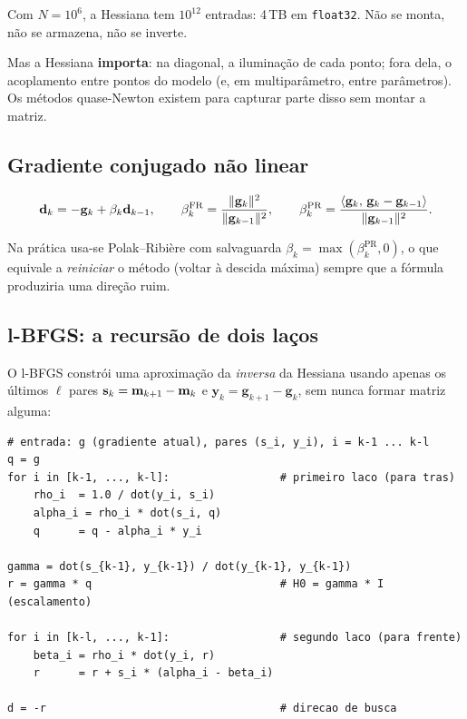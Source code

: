 \documentclass[11pt,a4paper,oneside]{report}
\begin{document}
Com $N = 10^{6}$, a Hessiana tem $10^{12}$ entradas: 4\,TB em
\texttt{float32}. N\~ao se monta, n\~ao se armazena, n\~ao se inverte.

Mas a Hessiana \textbf{importa}: na diagonal, a ilumina\c{c}\~ao de cada
ponto; fora dela, o acoplamento entre pontos do modelo (e, em
multipar\^ametro, entre par\^ametros). Os m\'etodos quase-Newton existem para
capturar parte disso sem montar a matriz.

\subsection*{Gradiente conjugado n\~ao linear}

\begin{equation}
\mathbf{d}_k = -\mathbf{g}_k + \beta_k \mathbf{d}_{k-1},
\qquad
\beta_k^{\text{FR}} = \frac{\lVert \mathbf{g}_k \rVert^{2}}{\lVert \mathbf{g}_{k-1} \rVert^{2}},
\qquad
\beta_k^{\text{PR}} = \frac{\langle \mathbf{g}_k,\,\mathbf{g}_k-\mathbf{g}_{k-1}\rangle}
  {\lVert \mathbf{g}_{k-1} \rVert^{2}} .
\end{equation}

Na pr\'atica usa-se Polak--Ribière com salvaguarda
$\beta_k = \max(\beta_k^{\text{PR}}, 0)$, o que equivale a
\emph{reiniciar} o m\'etodo (voltar \`a descida m\'axima) sempre que a
f\'ormula produziria uma dire\c{c}\~ao ruim.

\subsection*{l-BFGS: a recurs\~ao de dois la\c{c}os}

O l-BFGS constr\'oi uma aproxima\c{c}\~ao da \emph{inversa} da Hessiana usando
apenas os \'ultimos $\ell$ pares
$\mathbf{s}_k = \mathbf{m}_{k+1}-\mathbf{m}_k$ e
$\mathbf{y}_k = \mathbf{g}_{k+1}-\mathbf{g}_k$, sem nunca formar matriz
alguma:

\begin{lstlisting}
# entrada: g (gradiente atual), pares (s_i, y_i), i = k-1 ... k-l
q = g
for i in [k-1, ..., k-l]:                 # primeiro laco (para tras)
    rho_i  = 1.0 / dot(y_i, s_i)
    alpha_i = rho_i * dot(s_i, q)
    q      = q - alpha_i * y_i

gamma = dot(s_{k-1}, y_{k-1}) / dot(y_{k-1}, y_{k-1})
r = gamma * q                             # H0 = gamma * I  (escalamento)

for i in [k-l, ..., k-1]:                 # segundo laco (para frente)
    beta_i = rho_i * dot(y_i, r)
    r      = r + s_i * (alpha_i - beta_i)

d = -r                                    # direcao de busca
\end{lstlisting}
\end{document}
